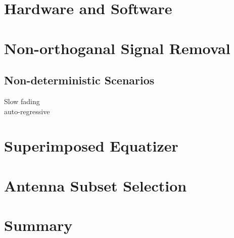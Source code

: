 \section{Hardware and Software}

\section{Non-orthoganal Signal Removal}

\subsection{Non-deterministic Scenarios}
Slow fading\\
auto-regressive\\

\section{Superimposed Equatizer}


\section{Antenna Subset Selection}

\section{Summary}
